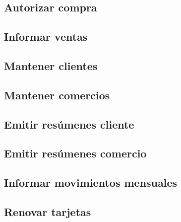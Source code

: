 \subsection{Autorizar compra}
\label{sec:modcasos:autorizarcompra}


\subsection{Informar ventas}
\label{sec:modcasos:informarventas}


\subsection{Mantener clientes}


\subsection{Mantener comercios}


\subsection{Emitir resúmenes cliente}
\label{sec:modcasos:emitirresumenescliente}


\subsection{Emitir resúmenes comercio}
\label{sec:modcasos:emitirresumenescomercio}


\subsection{Informar movimientos mensuales}
\label{sec:modcasos:informarmovimientosmensuales}


\subsection{Renovar tarjetas}

